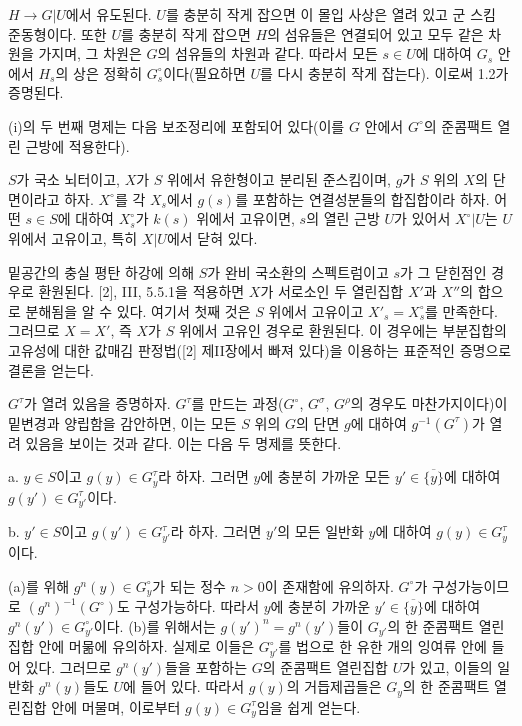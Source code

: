 $H\longrightarrow G|U$에서 유도된다. $U$를 충분히 작게 잡으면 이
몰입 사상은 열려 있고 군 스킴 준동형이다. 또한 $U$를 충분히 작게 잡으면
$H$의 섬유들은 연결되어 있고 모두 같은 차원을 가지며, 그 차원은 $G$의
섬유들의 차원과 같다. 따라서 모든 $s\in U$에 대하여 $G_s$ 안에서
$H_s$의 상은 정확히 $G_s^\circ$이다(필요하면 $U$를 다시 충분히 작게
잡는다). 이로써 1.2가 증명된다.

(i)의 두 번째 명제는 다음 보조정리에 포함되어 있다(이를 $G$ 안에서
$G^\circ$의 준콤팩트 열린 근방에 적용한다).

 $S$가 국소 뇌터이고, $X$가 $S$ 위에서 유한형이고
분리된 준스킴이며, $g$가 $S$ 위의 $X$의 단면이라고 하자. $X^\circ$를
각 $X_s$에서 $g(s)$를 포함하는 연결성분들의 합집합이라 하자. 어떤
$s\in S$에 대하여 $X_s^\circ$가 $k(s)$ 위에서 고유이면, $s$의 열린
근방 $U$가 있어서 $X^\circ|U$는 $U$ 위에서 고유이고, 특히 $X|U$에서
닫혀 있다.

밑공간의 충실 평탄 하강에 의해 $S$가 완비 국소환의 스펙트럼이고 $s$가
그 닫힌점인 경우로 환원된다. [2], III, 5.5.1을 적용하면 $X$가 서로소인
두 열린집합 $X'$과 $X''$의 합으로 분해됨을 알 수 있다. 여기서 첫째 것은
$S$ 위에서 고유이고 $X'_s=X_s^\circ$를 만족한다. 그러므로 $X=X'$, 즉
$X$가 $S$ 위에서 고유인 경우로 환원된다. 이 경우에는 부분집합의 고유성에
대한 값매김 판정법([2] 제II장에서 빠져 있다)을 이용하는 표준적인 증명으로
결론을 얻는다.

$G^\tau$가 열려 있음을 증명하자. $G^\tau$를 만드는 과정($G^\circ$,
$G^\sigma$, $G^\rho$의 경우도 마찬가지이다)이 밑변경과 양립함을 감안하면,
이는 모든 $S$ 위의 $G$의 단면 $g$에 대하여 $g^{-1}(G^\tau)$가 열려
있음을 보이는 것과 같다. 이는 다음 두 명제를 뜻한다.

\medskip
\noindent a. $y\in S$이고 $g(y)\in G_y^\tau$라 하자. 그러면
$y$에 충분히 가까운 모든 $y'\in\overline{\{y\}}$에 대하여
$g(y')\in G_{y'}^\tau$이다.

\medskip
\noindent b. $y'\in S$이고 $g(y')\in G_{y'}^\tau$라 하자. 그러면
$y'$의 모든 일반화 $y$에 대하여 $g(y)\in G_y^\tau$이다.

(a)를 위해 $g^n(y)\in G_y^\circ$가 되는 정수 $n>0$이 존재함에 유의하자.
$G^\circ$가 구성가능이므로 $(g^n)^{-1}(G^\circ)$도 구성가능하다. 따라서
$y$에 충분히 가까운 $y'\in\overline{\{y\}}$에 대하여
$g^n(y')\in G_{y'}^\circ$이다. (b)를 위해서는 $g(y')^n=g^n(y')$들이
$G_{y'}$의 한 준콤팩트 열린집합 안에 머묾에 유의하자. 실제로 이들은
$G_{y'}^\circ$를 법으로 한 유한 개의 잉여류 안에 들어 있다. 그러므로
$g^n(y')$들을 포함하는 $G$의 준콤팩트 열린집합 $U$가 있고, 이들의
일반화 $g^n(y)$들도 $U$에 들어 있다. 따라서 $g(y)$의 거듭제곱들은
$G_y$의 한 준콤팩트 열린집합 안에 머물며, 이로부터
$g(y)\in G_y^\tau$임을 쉽게 얻는다.

